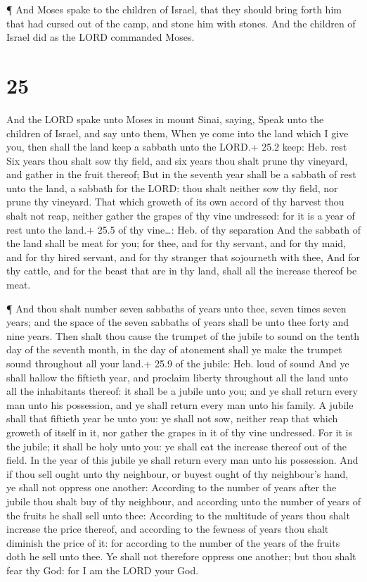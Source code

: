  ¶ And Moses spake to the children of Israel, that they
should bring forth him that had cursed out of the camp, and stone him
with stones. And the children of Israel did as the LORD commanded Moses.

\hypertarget{section-24}{%
\section{25}\label{section-24}}

 And the LORD spake unto Moses in mount Sinai, saying,
 Speak unto the children of Israel, and say unto them, When
ye come into the land which I give you, then shall the land keep a
sabbath unto the LORD.+ 25.2 keep: Heb. rest  Six years thou
shalt sow thy field, and six years thou shalt prune thy vineyard, and
gather in the fruit thereof;  But in the seventh year shall
be a sabbath of rest unto the land, a sabbath for the LORD: thou shalt
neither sow thy field, nor prune thy vineyard.  That which
groweth of its own accord of thy harvest thou shalt not reap, neither
gather the grapes of thy vine undressed: for it is a year of rest unto
the land.+ 25.5 of thy vine\ldots: Heb. of thy separation 
And the sabbath of the land shall be meat for you; for thee, and for thy
servant, and for thy maid, and for thy hired servant, and for thy
stranger that sojourneth with thee,  And for thy cattle, and
for the beast that are in thy land, shall all the increase thereof be
meat.

 ¶ And thou shalt number seven sabbaths of years unto thee,
seven times seven years; and the space of the seven sabbaths of years
shall be unto thee forty and nine years.  Then shalt thou
cause the trumpet of the jubile to sound on the tenth day of the seventh
month, in the day of atonement shall ye make the trumpet sound
throughout all your land.+ 25.9 of the jubile: Heb. loud of sound
 And ye shall hallow the fiftieth year, and proclaim
liberty throughout all the land unto all the inhabitants thereof: it
shall be a jubile unto you; and ye shall return every man unto his
possession, and ye shall return every man unto his family. 
A jubile shall that fiftieth year be unto you: ye shall not sow, neither
reap that which groweth of itself in it, nor gather the grapes in it of
thy vine undressed.  For it is the jubile; it shall be holy
unto you: ye shall eat the increase thereof out of the field.
 In the year of this jubile ye shall return every man unto
his possession.  And if thou sell ought unto thy neighbour,
or buyest ought of thy neighbour's hand, ye shall not oppress one
another:  According to the number of years after the jubile
thou shalt buy of thy neighbour, and according unto the number of years
of the fruits he shall sell unto thee:  According to the
multitude of years thou shalt increase the price thereof, and according
to the fewness of years thou shalt diminish the price of it: for
according to the number of the years of the fruits doth he sell unto
thee.  Ye shall not therefore oppress one another; but thou
shalt fear thy God: for I am the LORD your God.


